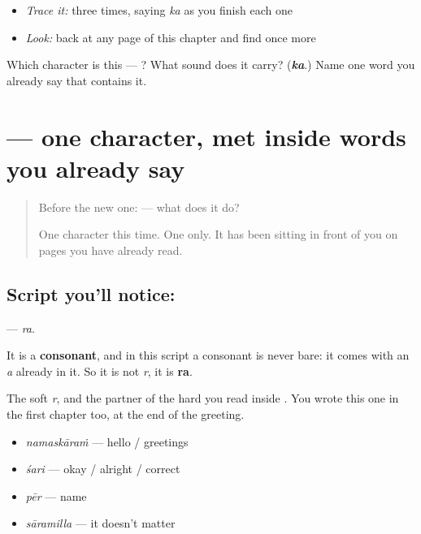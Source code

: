 \begin{itemize}
\raggedright
  \item \emph{Trace it:}  three times, saying \emph{ka} as you finish each one
  \item \emph{Look:} back at any page of this chapter and find  once more
\end{itemize}

\begin{tcolorbox}[breakable,colback=teal!4,colframe=teal!35!black,title={Before you move on}]
Which character is this — ? What sound does it carry? (\emph{\textbf{ka}}.) Name one word you already say that contains it.
\end{tcolorbox}
\section[\texorpdfstring{\ml{ര} (ra)}{ര (ra)}]{ — one character, met inside words you already say}

\label{lesson:ML-S109-letter-ra}



\begin{quote}
Before the new one:  — what does it do?

One character this time. One only. It has been sitting in front of you on pages you have already read.
\end{quote}

\subsection*{Script you'll notice: }
\textbf{} — \emph{ra}.

It is a \textbf{consonant}, and in this script a consonant is never bare: it comes with an \emph{a} already in it. So it is not \emph{r}, it is \textbf{ra}.

The soft \emph{r}, and the partner of the hard \textbf{} you read inside \textbf{}. You wrote this one in the first chapter too, at the end of the greeting.

\begin{itemize}
\raggedright
  \item \textbf{} \emph{namaskāraṁ} — hello / greetings
  \item \textbf{} \emph{śari} — okay / alright / correct
  \item \textbf{} \emph{pēr} — name
  \item \textbf{} \emph{sāramilla} — it doesn't matter
\end{itemize}

